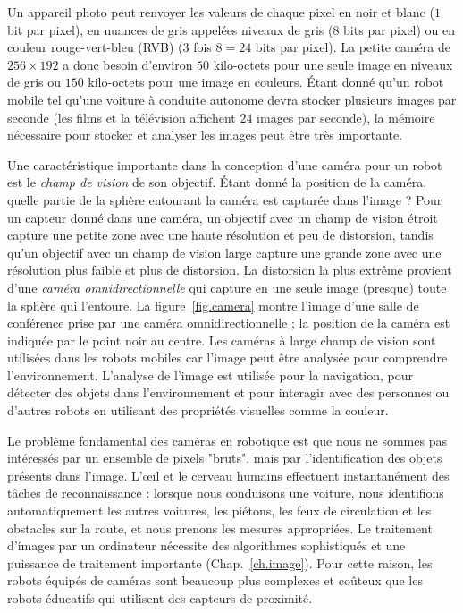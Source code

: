 Un appareil photo peut renvoyer les valeurs de chaque pixel en noir et blanc ($1$ bit par pixel), en nuances de gris appelées niveaux de gris ($8$ bits par pixel) ou en couleur rouge-vert-bleu (RVB) ($3$ fois $8=24$ bits par pixel). La petite caméra de $256\times 192$ a donc besoin d'environ $50$ kilo-octets pour une seule image en niveaux de gris ou $150$ kilo-octets pour une image en couleurs. Étant donné qu'un robot mobile tel qu'une voiture à conduite autonome devra stocker plusieurs images par seconde (les films et la télévision affichent $24$ images par seconde), la mémoire nécessaire pour stocker et analyser les images peut être très importante.

Une caractéristique importante dans la conception d'une caméra pour un robot est le \emph{champ de vision} de son objectif. Étant donné la position de la caméra, quelle partie de la sphère entourant la caméra est capturée dans l'image ? Pour un capteur donné dans une caméra, un objectif avec un champ de vision étroit capture une petite zone avec une haute résolution et peu de distorsion, tandis qu'un objectif avec un champ de vision large capture une grande zone avec une résolution plus faible et plus de distorsion. La distorsion la plus extrême provient d'une \emph{caméra omnidirectionnelle} qui capture en une seule image (presque) toute la sphère qui l'entoure. La figure~\ref{fig.camera} montre l'image d'une salle de conférence prise par une caméra omnidirectionnelle ; la position de la caméra est indiquée par le point noir au centre. Les caméras à large champ de vision sont utilisées dans les robots mobiles car l'image peut être analysée pour comprendre l'environnement. L'analyse de l'image est utilisée pour la navigation, pour détecter des objets dans l'environnement et pour interagir avec des personnes ou d'autres robots en utilisant des propriétés visuelles comme la couleur.

Le problème fondamental des caméras en robotique est que nous ne sommes pas intéressés par un ensemble de pixels "bruts", mais par l'identification des objets présents dans l'image. L'œil et le cerveau humains effectuent instantanément des tâches de reconnaissance : lorsque nous conduisons une voiture, nous identifions automatiquement les autres voitures, les piétons, les feux de circulation et les obstacles sur la route, et nous prenons les mesures appropriées. Le traitement d'images par un ordinateur nécessite des algorithmes sophistiqués et une puissance de traitement importante (Chap.~\ref{ch.image}). Pour cette raison, les robots équipés de caméras sont beaucoup plus complexes et coûteux que les robots éducatifs qui utilisent des capteurs de proximité.

